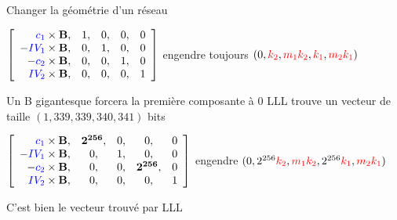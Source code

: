 \begin{frame}{Changer la géométrie d'un réseau}

\begin{outline}
    \1 $\left[
    \begin{array}{r c c c c}
        \textcolor{blue}{c_1} \times \mathbf{B},  &1, &0, &0, &0  \\
        -\textcolor{blue}{IV_1} \times \mathbf{B}, &0, &1, &0, &0 \\
        -\textcolor{blue}{c_2} \times \mathbf{B}, &0, &0, &1, &0 \\
        \textcolor{blue}{IV_2} \times \mathbf{B}, &0, &0, &0, &1 \\
    \end{array}
    \right]$ engendre toujours $(0, \textcolor{red}{k_2},\textcolor{red}{m_1}\textcolor{red}{k_2},\textcolor{red}{k_1},\textcolor{red}{m_2}\textcolor{red}{k_1})$
    
    \pause \1 Un B gigantesque forcera la première composante à 0
        \2[$\longrightarrow$] LLL trouve un vecteur de taille $(1, 339, 339, 340, 341)$ bits
    \pause
    
    \vspace{0.5cm}
    
     \1 $\left[
    \begin{array}{r c c c c}
        \textcolor{blue}{c_1} \times \mathbf{B},  &\mathbf{2^{256}}, &0, &0, &0  \\
        -\textcolor{blue}{IV_1} \times \mathbf{B}, &0, &1, &0, &0 \\
        -\textcolor{blue}{c_2} \times \mathbf{B}, &0, &0, &\mathbf{2^{256}}, &0 \\
        \textcolor{blue}{IV_2} \times \mathbf{B}, &0, &0, &0, &1 \\
    \end{array}
    \right]$ engendre $(0, 2^{256}\textcolor{red}{k_2},\textcolor{red}{m_1}\textcolor{red}{k_2},2^{256}\textcolor{red}{k_1},\textcolor{red}{m_2}\textcolor{red}{k_1})$

        \pause
        
    \2[$\longrightarrow$] C'est bien le vecteur trouvé par LLL \flag{}
\end{outline}
\end{frame} 


